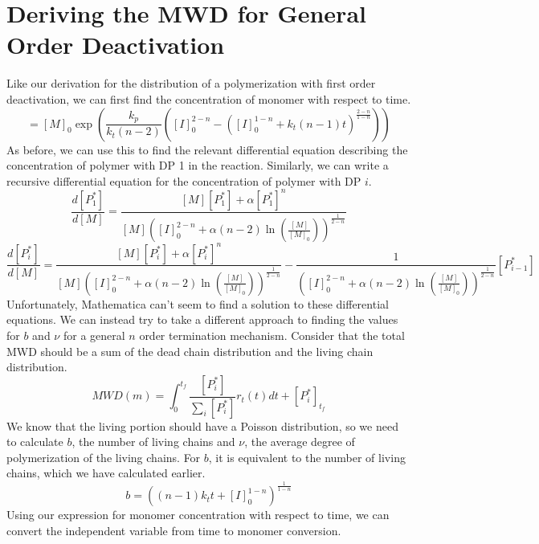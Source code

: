 \documentclass[12pt]{article}
\begin{document}
\section*{Deriving the MWD for General Order Deactivation}
Like our derivation for the distribution of a polymerization with first order deactivation, we can first find the concentration of monomer with respect to time. 
\begin{equation}
  [M]=[M]_0\exp\left(\frac{k_p}{k_t(n-2)}\left([I]_0^{2-n}-\left([I]_0^{1-n}+k_t(n-1)t\right)^{\frac{2-n}{1-n}}\right)\right)
\end{equation}
As before, we can use this to find the relevant differential equation describing the concentration of polymer with DP 1 in the reaction. Similarly, we can write a recursive differential equation for the concentration of polymer with DP $i$.
\begin{equation}
  \frac{d[P_1^*]}{d[M]} = \frac{[M][P_1^*]+\alpha[P_1^*]^n}{[M]\left([I]_0^{2-n}+\alpha(n-2)\ln\left(\frac{[M]}{[M]_0}\right)\right)^{\frac{1}{2-n}}}
\end{equation}
\begin{equation}
  \frac{d[P_i^*]}{d[M]} = \frac{[M][P_i^*]+\alpha[P_i^*]^n}{[M]\left([I]_0^{2-n}+\alpha(n-2)\ln\left(\frac{[M]}{[M]_0}\right)\right)^{\frac{1}{2-n}}}-\frac{1}{\left([I]_0^{2-n}+\alpha(n-2)\ln\left(\frac{[M]}{[M]_0}\right)\right)^{\frac{1}{2-n}}}[P_{i-1}^*]
\end{equation}
Unfortunately, Mathematica can't seem to find a solution to these differential equations. We can instead try to take a different approach to finding the values for $b$ and $\nu$ for a general $n$ order termination mechanism. Consider that the total MWD should be a sum of the dead chain distribution and the living chain distribution. 
\begin{equation}
  MWD(m) = \int_0^{t_f}\frac{[P_i^*]}{\sum_i[P_i^*]}r_t(t)dt + [P_i^*]_{t_f}
\end{equation}
We know that the living portion should have a Poisson distribution, so we need to calculate $b$, the number of living chains and $\nu$, the average degree of polymerization of the living chains. For $b$, it is equivalent to the number of living chains, which we have calculated earlier.
\begin{equation}
  b = \left((n-1)k_tt+[I]_0^{1-n}\right)^{\frac{1}{1-n}}
\end{equation}
Using our expression for monomer concentration with respect to time, we can convert the independent variable from time to monomer conversion.
\end{document}
